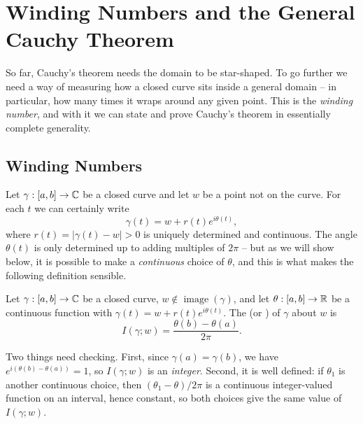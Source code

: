 \documentclass[a4paper]{scrartcl}
\begin{document}
\section{Winding Numbers and the General Cauchy Theorem}

So far, Cauchy's theorem needs the domain to be star-shaped. To go further we need a way of measuring how a closed curve sits inside a general domain -- in particular, how many times it wraps around any given point. This is the \emph{winding number}, and with it we can state and prove Cauchy's theorem in essentially complete generality.

\subsection{Winding Numbers}

Let $\gamma: [a, b] \rightarrow \mathbb{C}$ be a closed curve and let $w$ be a point not on the curve. For each $t$ we can certainly write
$$
\gamma(t) = w + r(t)e^{i \theta(t)},
$$
where $r(t) = |\gamma(t) - w| > 0$ is uniquely determined and continuous. The angle $\theta(t)$ is only determined up to adding multiples of $2\pi$ -- but as we will show below, it is possible to make a \emph{continuous} choice of $\theta$, and this is what makes the following definition sensible.

\begin{definition}
    Let $\gamma : [a, b] \rightarrow \mathbb{C}$ be a closed curve, $w \notin \operatorname{image}(\gamma)$, and let $\theta: [a, b] \rightarrow \mathbb{R}$ be a continuous function with $\gamma(t) = w + r(t)e^{i\theta(t)}$. The  (or ) of $\gamma$ about $w$ is
    $$
    I(\gamma; w) = \frac{\theta(b) - \theta(a)}{2 \pi}.
    $$
\end{definition}

Two things need checking. First, since $\gamma(a) = \gamma(b)$, we have $e^{i(\theta(b) - \theta(a))} = 1$, so $I(\gamma; w)$ is an \emph{integer}. Second, it is well defined: if $\theta_1$ is another continuous choice, then $(\theta_1 - \theta)/2\pi$ is a continuous integer-valued function on an interval, hence constant, so both choices give the same value of $I(\gamma; w)$.

\begin{center}
\end{center}
\end{document}
